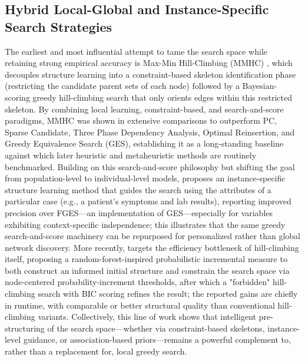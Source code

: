 \subsection{Hybrid Local-Global and Instance-Specific Search Strategies}
The earliest and most influential attempt to tame the search space while retaining strong empirical accuracy is Max-Min Hill-Climbing (MMHC) \cite{tsamardinos2006max}, which decouples structure learning into a constraint-based skeleton identification phase (restricting the candidate parent sets of each node) followed by a Bayesian-scoring greedy hill-climbing search that only orients edges within this restricted skeleton. By combining local learning, constraint-based, and search-and-score paradigms, MMHC was shown in extensive comparisons to outperform PC, Sparse Candidate, Three Phase Dependency Analysis, Optimal Reinsertion, and Greedy Equivalence Search (GES), establishing it as a long-standing baseline against which later heuristic and metaheuristic methods are routinely benchmarked. Building on this search-and-score philosophy but shifting the goal from population-level to individual-level models, \cite{jabbari2018instance} proposes an instance-specific structure learning method that guides the search using the attributes of a particular case (e.g., a patient's symptoms and lab results), reporting improved precision over FGES---an implementation of GES---especially for variables exhibiting context-specific independence; this illustrates that the same greedy search-and-score machinery can be repurposed for personalized rather than global network discovery. More recently, \cite{liu2022bayesian} targets the efficiency bottleneck of hill-climbing itself, proposing a random-forest-inspired probabilistic incremental measure to both construct an informed initial structure and constrain the search space via node-centered probability-increment thresholds, after which a "forbidden" hill-climbing search with BIC scoring refines the result; the reported gains are chiefly in runtime, with comparable or better structural quality than conventional hill-climbing variants. Collectively, this line of work shows that intelligent pre-structuring of the search space---whether via constraint-based skeletons, instance-level guidance, or association-based priors---remains a powerful complement to, rather than a replacement for, local greedy search.

